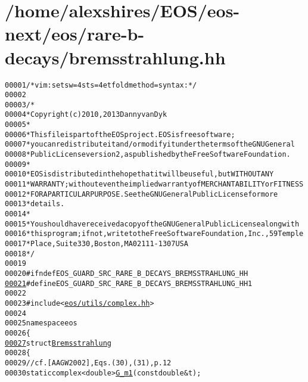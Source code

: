 \hypertarget{bremsstrahlung_8hh_source}{
\section{/home/alexshires/EOS/eos-\/next/eos/rare-\/b-\/decays/bremsstrahlung.hh}
}


\begin{footnotesize}\begin{alltt}
00001 \textcolor{comment}{/* vim: set sw=4 sts=4 et foldmethod=syntax : */}
00002 
00003 \textcolor{comment}{/*}
00004 \textcolor{comment}{ * Copyright (c) 2010, 2013 Danny van Dyk}
00005 \textcolor{comment}{ *}
00006 \textcolor{comment}{ * This file is part of the EOS project. EOS is free software;}
00007 \textcolor{comment}{ * you can redistribute it and/or modify it under the terms of the GNU General}
00008 \textcolor{comment}{ * Public License version 2, as published by the Free Software Foundation.}
00009 \textcolor{comment}{ *}
00010 \textcolor{comment}{ * EOS is distributed in the hope that it will be useful, but WITHOUT ANY}
00011 \textcolor{comment}{ * WARRANTY; without even the implied warranty of MERCHANTABILITY or FITNESS}
00012 \textcolor{comment}{ * FOR A PARTICULAR PURPOSE.  See the GNU General Public License for more}
00013 \textcolor{comment}{ * details.}
00014 \textcolor{comment}{ *}
00015 \textcolor{comment}{ * You should have received a copy of the GNU General Public License along with}
00016 \textcolor{comment}{ * this program; if not, write to the Free Software Foundation, Inc., 59 Temple}
00017 \textcolor{comment}{ * Place, Suite 330, Boston, MA  02111-1307  USA}
00018 \textcolor{comment}{ */}
00019 
00020 \textcolor{preprocessor}{#ifndef EOS\_GUARD\_SRC\_RARE\_B\_DECAYS\_BREMSSTRAHLUNG\_HH}
\hypertarget{bremsstrahlung_8hh_source_l00021}{}\hyperlink{bremsstrahlung_8hh_a9d74e8157f9ef6e8b95db461d9b08829}{00021} \textcolor{preprocessor}{}\textcolor{preprocessor}{#define EOS\_GUARD\_SRC\_RARE\_B\_DECAYS\_BREMSSTRAHLUNG\_HH 1}
00022 \textcolor{preprocessor}{}
00023 \textcolor{preprocessor}{#include <\hyperlink{complex_8hh}{eos/utils/complex.hh}>}
00024 
00025 \textcolor{keyword}{namespace }eos
00026 \{
\hypertarget{bremsstrahlung_8hh_source_l00027}{}\hyperlink{structeos_1_1Bremsstrahlung}{00027}     \textcolor{keyword}{struct }\hyperlink{structeos_1_1Bremsstrahlung}{Bremsstrahlung}
00028     \{
00029         \textcolor{comment}{// cf. [AAGW2002], Eqs. (30), (31), p. 12}
00030         \textcolor{keyword}{static} complex<double> \hyperlink{structeos_1_1Bremsstrahlung_af39debb09760b0c3b6983ac6d7e28d05}{G_m1}(\textcolor{keyword}{const} \textcolor{keywordtype}{double} & t);

\end{alltt}
\end{footnotesize}
